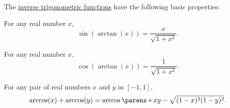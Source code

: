\begin{proposition}\label{thm:def:inverse_trigonometric_function}
  The \hyperref[def:inverse_trigonometric_functions]{inverse trigonometric functions} have the following basic properties:

  \begin{thmenum}
     For any real number \( x \),
    \begin{equation}\label{eq:thm:def:inverse_trigonometric_function/sin_of_arctan}
      \sin(\arctan(x)) = \frac x {\sqrt{1 + x^2}}.
    \end{equation}

     For any real number \( x \),
    \begin{equation}\label{eq:thm:def:inverse_trigonometric_function/cos_of_arctan}
      \cos(\arctan(x)) = \frac 1 {\sqrt{1 + x^2}}.
    \end{equation}

     For any pair of real numbers \( x \) and \( y \) in \( [-1, 1] \),
    \begin{equation}\label{eq:thm:def:inverse_trigonometric_function/sum_of_arccos}
      \arccos(x) + \arccos(y) = \arccos\parens*{ xy - \sqrt{ (1 - x)^2 (1 - y)^2 } }.
    \end{equation}
  \end{thmenum}
\end{proposition}

